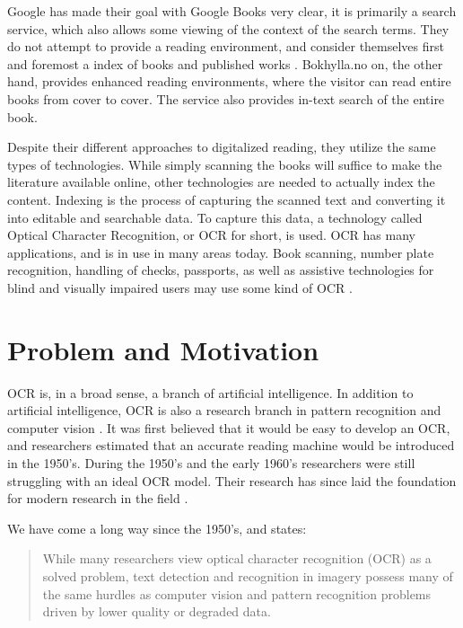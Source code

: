 Google has made their goal with Google Books very clear, it is primarily a search service, which also allows some viewing of the context of the search terms. They do not attempt to provide a reading environment, and consider themselves first and foremost a index of books and published works \citep{coyle2006mass}. Bokhylla.no on, the other hand, provides enhanced reading environments, where the visitor can read entire books from cover to cover. The service also provides in-text search of the entire book. 

Despite their different approaches to digitalized reading, they utilize the same types of technologies. While simply scanning the books will suffice to make the literature available online, other technologies are needed to actually index the content. Indexing is the process of capturing the scanned text and converting it into editable and searchable data. To capture this data, a technology called Optical Character Recognition, or OCR for short, is used. OCR has many applications, and is in use in many areas today. Book scanning, number plate recognition, handling of checks, passports, as well as assistive technologies for blind and visually impaired users may use some kind of OCR \citep{mori1999optical, kurzweil2000reading}.


\section{Problem and Motivation}
\label{sec:problem_motivation}
OCR is, in a broad sense, a branch of artificial intelligence. In addition to artificial intelligence, OCR is also a research branch in pattern recognition and computer vision \citep{mori1999optical}. It was first believed that it would be easy to develop an OCR, and researchers estimated that an accurate reading machine would be introduced in the 1950's. During the 1950's and the early 1960's researchers were still struggling with an ideal OCR model. Their research has since laid the foundation for modern research in the field \citep{mori1992historical}.

We have come a long way since the 1950's, and \citep{ye2015text} states:

\begin{quote}
    While many researchers view optical character recognition (OCR) as a solved problem, text detection and recognition in imagery possess many of the same hurdles as computer vision and pattern recognition problems driven by lower quality or degraded data.
\end{quote}

